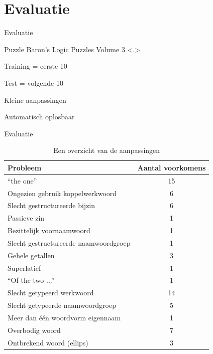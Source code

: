 \documentclass[notes, dvipsnames]{beamer}
\newcommand{\seperation}{
	\vspace{1em}
	\ppause
}
\newcommand{\hitem}{
	\ppause
	\item
}
\newcommand{\ppause}{\onslide<+>}
\newcommand{\nnote}[1]{\note<.>{#1}}
\begin{document}
  \section{Evaluatie}
  \begin{frame}{Evaluatie}
    \begin{itemize}
      \hitem Puzzle Baron's Logic Puzzles Volume 3 \cite{logigrammen}
      \nnote{
        \item Training = eerste 10
        \item Test = volgende 10
      }

      \seperation
      \item Kleine aanpassingen
      \item Automatisch oplosbaar
    \end{itemize}
  \end{frame}

  \begin{frame}{Evaluatie}
    \begin{table}[t]
      \centering
      \begin{tabular}{lc}
        \hline
        \textbf{Probleem} & \textbf{Aantal voorkomens} \\ 
        \hline
        ``the one'' & 15 \\
        Ongezien gebruik koppelwerkwoord & 6 \\
        Slecht gestructureerde bijzin & 6 \\
        Passieve zin & 1 \\
        Bezittelijk voornaamwoord & 1 \\
        Slecht gestructureerde naamwoordgroep & 1 \\
        \hline
        Gehele getallen & 3 \\
        Superlatief & 1 \\
        ``Of the two ...'' & 1 \\
        \hline
        Slecht getypeerd werkwoord & 14 \\
        Slecht getypeerde naamwoordgroep & 5 \\
        \hline
        Meer dan één woordvorm eigennaam  & 1 \\
        \hline
        Overbodig woord & 7 \\
        Ontbrekend woord (ellips) & 3 \\
        \hline
      \end{tabular}
      \caption{Een overzicht van de aanpassingen}
      \label{tbl:resultaten}
    \end{table}
  \end{frame}
\end{document}
